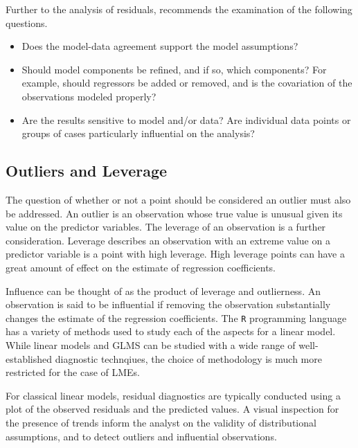 \documentclass[12pt, a4paper]{report}
\theoremstyle{plain}
\theoremstyle{definition}
\theoremstyle{remark}
\begin{document}
Further to the analysis of residuals, \citet{schab} recommends the examination of the following questions.
\begin{itemize}
	\item Does the model-data agreement support the model assumptions?
	\item Should model components be refined, and if so, which components? For example, should regressors
	be added or removed, and is the covariation of the observations modeled properly?
	\item Are the results sensitive to model and/or data? Are individual data points or groups of cases particularly
	influential on the analysis?
\end{itemize}



\subsection{Outliers and Leverage}


The question of whether or not a point should be considered an outlier must also be addressed. An outlier is an observation whose true value is unusual given its value on the predictor variables. The leverage of an observation is a further consideration. Leverage describes an observation with an extreme value on a predictor variable is a point with high leverage. High leverage points can have a great amount of effect on the estimate of regression coefficients.

Influence can be thought of as the product of leverage and outlierness. An observation is said to be influential if removing the observation substantially changes the estimate of the regression coefficients. The \texttt{R} programming language has a variety of methods used to study each of the aspects for a linear model. While linear models and GLMS can be studied with a wide range of well-established diagnostic technqiues, the choice of methodology is much more restricted for the case of LMEs.

For classical linear models, residual diagnostics are typically conducted using a plot of the observed residuals and the predicted values. A visual inspection for the presence of trends inform the analyst on the validity of distributional assumptions, and to detect outliers and influential observations.
\end{document}
